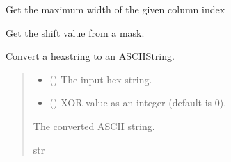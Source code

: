 \documentclass[letterpaper,10pt,english]{sphinxmanual}
\begin{document}
\begin{fulllineitems}

\pysigstartsignatures
{}
\pysigstopsignatures
\sphinxAtStartPar
Get the maximum width of the given column index

\end{fulllineitems}



\begin{fulllineitems}

\pysigstartsignatures
{}
\pysigstopsignatures
\sphinxAtStartPar
Get the shift value from a mask.

\end{fulllineitems}



\begin{fulllineitems}

\pysigstartsignatures
{}
\pysigstopsignatures
\sphinxAtStartPar
Convert a hexstring to an ASCII\sphinxhyphen{}String.
\begin{quote}\begin{description}
\begin{itemize}
\item {} 
\sphinxAtStartPar
{} () \textendash{} The input hex string.

\item {} 
\sphinxAtStartPar
{} () \textendash{} XOR value as an integer (default is 0).

\end{itemize}

\sphinxAtStartPar
The converted ASCII string.

\sphinxAtStartPar
str

\end{description}\end{quote}

\end{fulllineitems}
\end{document}
